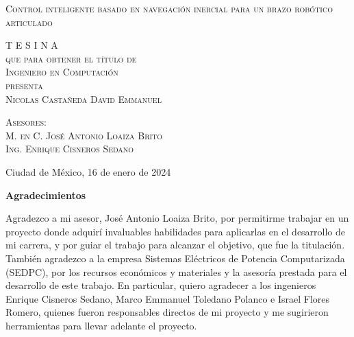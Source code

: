 \documentclass[12pt, twoside]{report}
\begin{document}
        \begin{minipage}[c][0.70\textheight][t]{0.7\textwidth}
            \begin{center}
                \vspace{1.5cm}

                {\Huge\scshape Control inteligente basado en navegaci\'on inercial para un brazo rob\'otico articulado}

                \vspace{3.5cm}            

               \textsc{\LARGE T E S I N A}\\[0.5cm]
                \textsc{\large que para obtener el t\'itulo de}\\[0.5cm]
                \textsc{\large Ingeniero en Computaci\'on}\\[0.5cm]
                \textsc{\large presenta}\\[0.5cm]
                \textsc{\large Nicolas Castañeda David Emmanuel}\\[2cm]          

                \vspace{1cm}

          \end{center}

                {\large\scshape Asesores:\\[0.3cm] {M. en C. Jos\'e Antonio Loaiza Brito\\ 
		Ing. Enrique Cisneros Sedano}}

                \vspace{0.5cm}

            \begin{flushright}
                \large{Ciudad de México, 16 de enero de 2024}
            \end{flushright}
        \end{minipage}

\restoregeometry

\onehalfspacing

\newpage
\thispagestyle{empty}
\textbf{\Huge Agradecimientos}
\vspace{1cm}

Agradezco a mi asesor, José Antonio Loaiza Brito, por permitirme trabajar en un proyecto donde adquirí invaluables habilidades para aplicarlas en el desarrollo de mi carrera, y por guiar el trabajo para alcanzar el objetivo, que fue la titulación.\\
También agradezco a la empresa Sistemas Eléctricos de Potencia Computarizada (SEDPC), por los recursos económicos y materiales y la asesoría prestada para el desarrollo de este trabajo. En particular, quiero agradecer a los ingenieros Enrique Cisneros Sedano, Marco Emmanuel Toledano Polanco e Israel Flores Romero, quienes fueron responsables directos de mi proyecto y me sugirieron herramientas para llevar adelante el proyecto.
\end{document}
